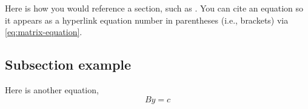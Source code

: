 \lipsum[2-4]

Here is how you would reference a section, such as . You can cite an equation so it appears as a hyperlink equation number in parentheses (i.e., brackets) via \eqref{eq:matrix-equation}.
\subsection{Subsection example}

Here is another equation,
\begin{equation}
    By=c
\end{equation}

\lipsum[2-4]

